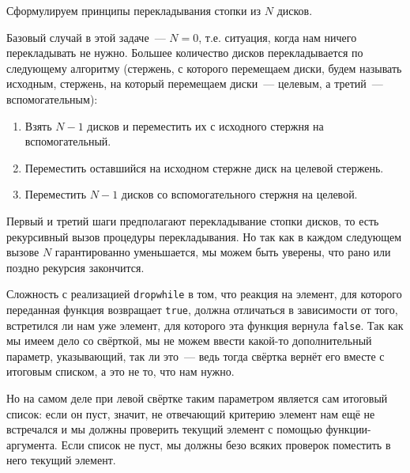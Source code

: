 \documentclass[
  paper=a4,
  fontsize=14pt,
  openany,
  appendixprefix=true
]{scrbook}
\begin{document}







Сформулируем принципы перекладывания стопки из $N$ дисков.

Базовый случай в этой задаче~--- $N=0$, т.е. ситуация, когда нам ничего перекладывать не нужно. Большее количество дисков перекладывается по следующему алгоритму (стержень, с которого перемещаем диски, будем называть исходным, стержень, на который перемещаем диски~--- целевым, а третий~--- вспомогательным):

\begin{enumerate}
\item Взять $N-1$ дисков и переместить их с исходного стержня на вспомогательный.
\item Переместить оставшийся на исходном стержне диск на целевой стержень.
\item Переместить $N-1$ дисков со вспомогательного стержня на целевой.
\end{enumerate}

Первый и третий шаги предполагают перекладывание стопки дисков, то есть рекурсивный вызов процедуры перекладывания. Но так как в каждом следующем вызове $N$ гарантированно уменьшается, мы можем быть уверены, что рано или поздно рекурсия закончится.




Сложность с реализацией \lstinline{dropwhile} в том, что реакция на элемент, для которого переданная функция возвращает \lstinline{true}, должна отличаться в зависимости от того, встретился ли нам уже элемент, для которого эта функция вернула \lstinline{false}. Так как мы имеем дело со свёрткой, мы не можем ввести какой-то дополнительный параметр, указывающий, так ли это~--- ведь тогда свёртка вернёт его вместе с итоговым списком, а это не то, что нам нужно.

Но на самом деле при левой свёртке таким параметром является сам итоговый список: если он пуст, значит, не отвечающий критерию элемент нам ещё не встречался и мы должны проверить текущий элемент с помощью функции-аргумента. Если список не пуст, мы должны безо всяких проверок поместить в него текущий элемент.
\end{document}
